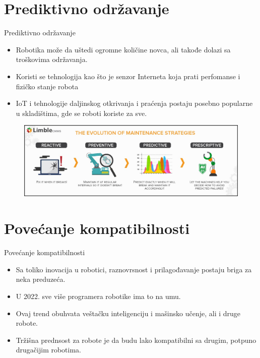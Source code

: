\documentclass{beamer}
\begin{document}
\section{Prediktivno održavanje}
\begin{frame}{Prediktivno održavanje}
    \begin{itemize}
        \item Robotika može da uštedi ogromne količine novca, ali takođe dolazi sa troškovima održavanja.    
        \item Koristi se tehnologija kao što je senzor Interneta koja prati perfomanse i fizičko stanje robota
        \item IoT i tehnologije daljinskog otkrivanja i praćenja postaju posebno popularne u skladištima, gde se roboti koriste za sve.
    \end{itemize}
    \begin{figure}
        \centering
        \includegraphics[scale=0.20]{dijagram.jpeg}
    \end{figure}
\end{frame}

\section{Povećanje kompatibilnosti}
\begin{frame}{Povećanje kompatibilnosti}
    \begin{itemize}
        \item Sa toliko inovacija u robotici, raznovrsnost i prilagođavanje postaju briga za neka preduzeća.    
        \item U 2022. sve više programera robotike ima to na umu.
        \item Ovaj trend obuhvata veštačku inteligenciju i mašinsko učenje, ali i druge robote.
        \item Tržišna prednsost za robote je da budu lako kompatibilni sa drugim,   potpuno drugačijim robotima.
    \end{itemize}
    
\end{frame}
\end{document}

